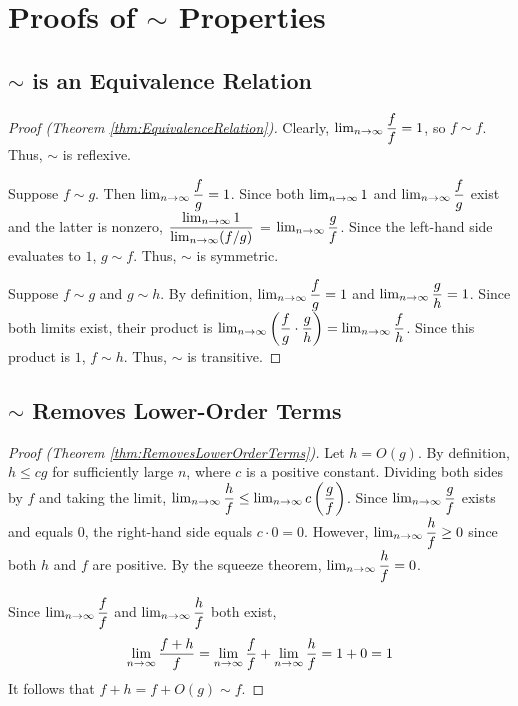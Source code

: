 \appendix
\appendixpage

\section{Proofs of $\sim$ Properties}

\subsection{$\sim$ is an Equivalence Relation}

\begin{proof}[Proof (Theorem \ref{thm:EquivalenceRelation})]
	Clearly, $\lim_{n \to \infty} \dfrac{f}{f} = 1$, so $f \sim f$. Thus, $\sim$ is reflexive.
	
	Suppose $f \sim g$. Then $\lim_{n \to \infty} \dfrac{f}{g} = 1$. Since both $\lim_{n \to \infty} 1$ and $\lim_{n \to \infty} \dfrac{f}{g}$ exist and the latter is nonzero, $\dfrac{\lim_{n \to \infty} 1}{\lim_{n \to \infty} (f / g)}$ = $\lim_{n \to \infty} \dfrac{g}{f}$. Since the left-hand side evaluates to $1$, $g \sim f$. Thus, $\sim$ is symmetric.
	
	Suppose $f \sim g$ and $g \sim h$. By definition, $\lim_{n \to \infty} \dfrac{f}{g} = 1$ and $\lim_{n \to \infty} \dfrac{g}{h} = 1$. Since both limits exist, their product is $\lim_{n \to \infty} \left( \dfrac{f}{g} \cdot \dfrac{g}{h} \right) = \lim_{n \to \infty} \dfrac{f}{h}$. Since this product is $1$, $f \sim h$. Thus, $\sim$ is transitive.
\end{proof}

\subsection{$\sim$ Removes Lower-Order Terms}

\begin{proof}[Proof (Theorem \ref{thm:RemovesLowerOrderTerms})]
	Let $h = O(g)$. By definition, $h \leq cg$ for sufficiently large $n$, where $c$ is a positive constant. Dividing both sides by $f$ and taking the limit, $\lim_{n \to \infty} \dfrac{h}{f} \leq \lim_{n \to \infty} c \left( \dfrac{g}{f} \right)$. Since $\lim_{n \to \infty} \dfrac{g}{f}$ exists and equals $0$, the right-hand side equals $c \cdot 0 = 0$. However, $\lim_{n \to \infty} \dfrac{h}{f} \geq 0$ since both $h$ and $f$ are positive. By the squeeze theorem, $\lim_{n \to \infty} \dfrac{h}{f} = 0$.
	
	Since $\lim_{n \to \infty} \dfrac{f}{f}$ and $\lim_{n \to \infty} \dfrac{h}{f}$ both exist,
	\begin{align*}
	\lim_{n \to \infty} \dfrac{f + h}{f} = \lim_{n \to \infty} \dfrac{f}{f} + \lim_{n \to \infty} \dfrac{h}{f} = 1 + 0 = 1
	\end{align*}
	It follows that $f + h = f + O(g) \sim f$.
\end{proof}

